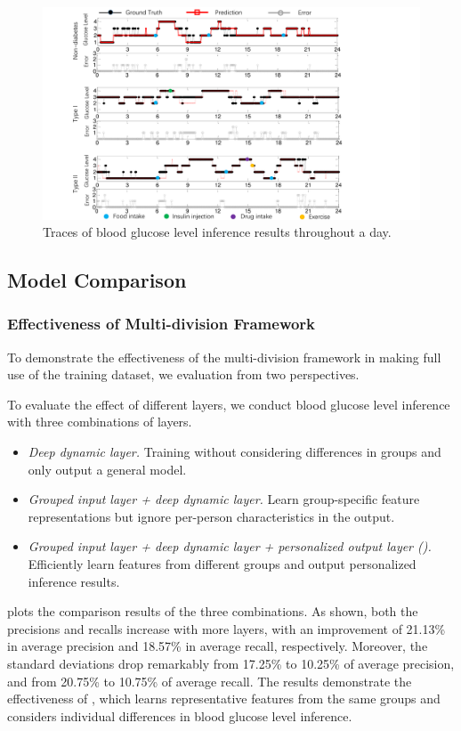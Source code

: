 \begin{figure}[h]
  \centering
  \includegraphics[width=0.8\columnwidth]{./img/pred_vs_gt2.pdf}
  \caption{Traces of blood glucose level inference results throughout a day.}
  \label{fig:pre_gt}
\end{figure}

\subsection{Model Comparison}

\subsubsection{Effectiveness of Multi-division Framework}
To demonstrate the effectiveness of the multi-division framework in making full use of the training dataset, we evaluation \modelname from two perspectives.

To evaluate the effect of different layers, we conduct blood glucose level inference with three combinations of layers.
\begin{itemize}
  \item
  \emph{Deep dynamic layer.}
  Training without considering differences in groups and only output a general model.
  \item
  \emph{Grouped input layer + deep dynamic layer.}
  Learn group-specific feature representations but ignore per-person characteristics in the output.
  \item
  \emph{Grouped input layer + deep dynamic layer + personalized output layer (\modelname).}
  Efficiently learn features from different groups and output personalized inference results.
\end{itemize}
 plots the comparison results of the three combinations.
As shown, both the precisions and recalls increase with more layers, with an improvement of 21.13\% in average precision and 18.57\% in average recall, respectively.
Moreover, the standard deviations drop remarkably from 17.25\% to 10.25\%  of average precision, and from 20.75\% to 10.75\% of average recall.
The results demonstrate the effectiveness of \modelname, which learns representative features from the same groups and considers individual differences in blood glucose level inference.

